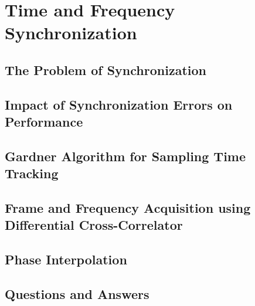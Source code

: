 \section{Time and Frequency Synchronization}
\subsection{The Problem of Synchronization}
\subsection{Impact of Synchronization Errors on Performance}
\subsection{Gardner Algorithm for Sampling Time Tracking}
\subsection{Frame and Frequency Acquisition using Differential Cross-Correlator}
\subsection{Phase Interpolation}
\subsection{Questions and Answers}